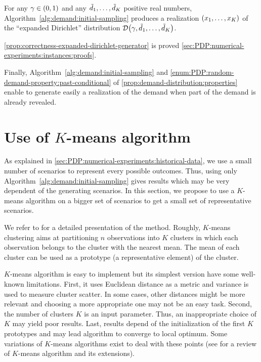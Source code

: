 \begin{prop}\label{prop:correctness-expanded-dirichlet-generator}
For any $\gamma\in\bracket{0,1}$ and any $\tilde{d}_1,\ldots,\tilde{d}_K$ positive real numbers, Algorithm~\ref{alg:demand:initial-sampling} produces a realization $\bracket{x_1,\ldots,x_K}$ of the ``expanded Dirichlet'' distribution $\cD\bracket{\gamma,\tilde{\demand}_1,\ldots,\tilde{\demand}_K}$.
\end{prop}


\cref{prop:correctness-expanded-dirichlet-generator} is proved \cref{sec:PDP:numerical-experiments:instances:proofs}.


Finally, Algorithm~\ref{alg:demand:initial-sampling} and \cref{enum:PDP:random-demand-property:past-conditional} of \cref{prop:demand-distribution:properties} enable to generate easily a realization of the demand when part of the demand is already revealed.


\section{Use of $K$-means algorithm}
\label{sec:PDP:numerical-experiments:k-means}


As explained in \cref{sec:PDP:numerical-experiments:historical-data}, we use a small number of scenarios to represent every possible outcomes.
Thus, using only Algorithm~\ref{alg:demand:initial-sampling} gives results which may be very dependent of the generating scenarios.
In this section, we propose to use a $K$-means algorithm on a bigger set of scenarios to get a small set of representative scenarios.


We refer to \citet[Chapter 14]{Hastie2009} for a detailed presentation of the method.
Roughly, $K$-means clustering aims at partitioning $n$ observations into $K$ clusters in which each observation belongs to the cluster with the nearest mean.
The mean of each cluster can be used as a prototype (\ie a representative element) of the cluster.


$K$-means algorithm is easy to implement but its simplest version have some well-known limitations.
First, it uses Euclidean distance as a metric and variance is used to measure cluster scatter.
In some cases, other distances might be more relevant and choosing a more appropriate one may not be an easy task.
Second, the number of clusters $K$ is an input parameter.
Thus, an inappropriate choice of $K$ may yield poor results.
Last, results depend of the initialization of the first $K$ prototypes and may lead algorithm to converge to local optimum.
Some variations of $K$-means algorithms exist to deal with these points (see \citet{Jain2010} for a review of $K$-means algorithm and its extensions).


